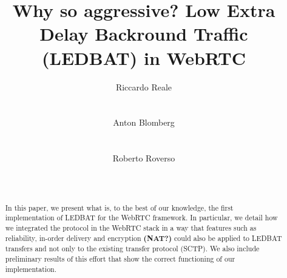 \documentclass{sig-alternate}
\begin{document}


\title{Why so aggressive? Low Extra Delay Backround Traffic (LEDBAT) in WebRTC}


\author{
\alignauthor
Riccardo Reale\\
      \\
      \\
\alignauthor
Anton Blomberg\\
      \\
      \\
\alignauthor
Roberto Roverso\\
      \\
      \\
}

\newcommand{\mysec}[1]{\vspace*{-0.0cm}\section{#1}}
\newcommand{\mysubsec}[1]{\vspace*{-0.0cm}\subsection{#1}\vspace*{0cm}}
\newcommand{\mysubsubsec}[1]{\vspace*{-0.0cm}\subsubsection{#1}\vspace*{0cm}}
\newcommand{\mypar}[1]{\vspace*{-0cm}\paragraph{#1}\vspace*{0cm}}

\maketitle

\begin{abstract}

In this paper, we present what is, to the best of our knowledge, the first implementation
of LEDBAT for the WebRTC framework. In particular, we detail how we integrated the
protocol in the WebRTC stack in a way that features such as reliability, in-order
delivery and encryption \textbf{ (NAT?)} could also be applied to LEDBAT transfers and not only to
the existing transfer protocol (SCTP). We also include preliminary results of this effort
that show the correct functioning of our implementation.
\end{abstract}
\end{document}
